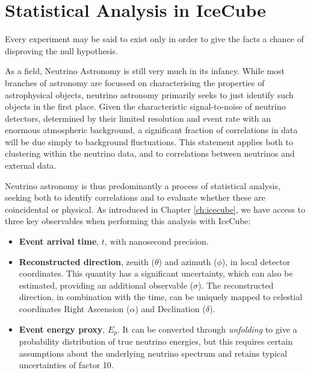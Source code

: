 \setchapterpreamble[u]{\margintoc}
\chapter{Statistical Analysis in IceCube}
\begin{fquote}Every experiment may be said to exist only in order to give the facts a chance of disproving the null hypothesis.
\end{fquote}

As a field, Neutrino Astronomy is still very much in its infancy. While most branches of astronomy are focussed on characterising the properties of astrophysical objects, neutrino astronomy primarily seeks to just identify such objects in the first place. Given the characteristic signal-to-noise of neutrino detectors, determined by their limited resolution and event rate with an enormous atmospheric background, a significant fraction of correlations in data will be due simply to background fluctuations. This statement applies both to clustering within the neutrino data, and to correlations between neutrinos and external data.

Neutrino astronomy is thus predominantly a process of statistical analysis, seeking both to identify correlations and to evaluate whether these are coincidental or physical. As introduced in Chapter \ref{ch:icecube}, we have access to three key observables when performing this analysis with IceCube:

\begin{itemize}
	\item \textbf{Event arrival time}, $t$, with nanosecond precision.
	\item \textbf{Reconstructed direction},  zenith ($\theta$) and azimuth ($\phi$), in local detector coordinates. This quantity has a significant uncertainty, which can also be estimated, providing an additional observable ($\sigma$). The reconstructed direction, in combination with the time, can be uniquely mapped to celestial coordinates Right Ascension ($\alpha$) and Declination ($\delta$).
	\item \textbf{Event energy proxy}, $E_{p}$. It can be converted through \emph{unfolding} to give a probability distribution of true neutrino energies, but this requires certain assumptions about the underlying neutrino spectrum and retains typical uncertainties of factor 10.
\end{itemize}

